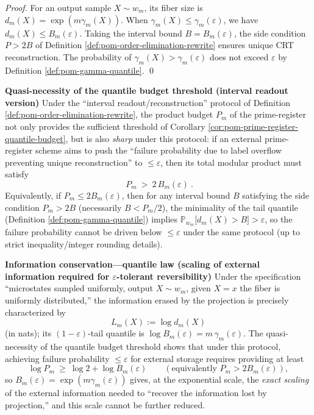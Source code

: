 \begin{proof}
For an output sample \(X\sim w_m\), its fiber size is \(d_m(X)=\exp(m\gamma_m(X))\).
When \(\gamma_m(X)\le\gamma_m(\varepsilon)\), we have \(d_m(X)\le B_m(\varepsilon)\).
Taking the interval bound \(B=B_m(\varepsilon)\), the side condition \(P>2B\) of Definition \ref{def:pom-order-elimination-rewrite} ensures unique CRT reconstruction.
The probability of \(\gamma_m(X)>\gamma_m(\varepsilon)\) does not exceed \(\varepsilon\) by Definition \ref{def:pom-gamma-quantile}. \qed
\end{proof}

\medskip\noindent\textbf{Quasi-necessity of the quantile budget threshold (interval readout version)}
Under the ``interval readout/reconstruction'' protocol of Definition \ref{def:pom-order-elimination-rewrite}, the product budget \(P_m\) of the prime-register not only provides the sufficient threshold of Corollary \ref{cor:pom-prime-register-quantile-budget}, but is also \emph{sharp} under this protocol:
if an external prime-register scheme aims to push the ``failure probability due to label overflow preventing unique reconstruction'' to \(\le \varepsilon\), then its total modular product must satisfy
\[
\boxed{\ P_m\ >\ 2\,B_m(\varepsilon)\ }.
\]
Equivalently, if \(P_m\le 2B_m(\varepsilon)\), then for any interval bound \(B\) satisfying the side condition \(P_m>2B\) (necessarily \(B<P_m/2\)), the minimality of the tail quantile (Definition \ref{def:pom-gamma-quantile}) implies
\(\mathbb{P}_{w_m}\!\big[d_m(X)>B\big]>\varepsilon\), so the failure probability cannot be driven below \(\le\varepsilon\) under the same protocol
(up to strict inequality/integer rounding details).

\medskip\noindent\textbf{Information conservation---quantile law (scaling of external information required for \(\varepsilon\)-tolerant reversibility)}
Under the specification ``microstates sampled uniformly, output \(X\sim w_m\), given \(X=x\) the fiber is uniformly distributed,'' the information erased by the projection is precisely characterized by
\[
L_m(X):=\log d_m(X)
\]
(in nats); its \((1-\varepsilon)\)-tail quantile is
\(\log B_m(\varepsilon)=m\,\gamma_m(\varepsilon)\).
The quasi-necessity of the quantile budget threshold shows that under this protocol, achieving failure probability \(\le\varepsilon\) for external storage requires providing at least
\[
\log P_m\ \ge\ \log 2+\log B_m(\varepsilon)
\qquad(\text{equivalently }P_m>2B_m(\varepsilon)),
\]
so \(B_m(\varepsilon)=\exp(m\gamma_m(\varepsilon))\) gives, at the exponential scale, the \emph{exact scaling} of the external information needed to ``recover the information lost by projection,'' and this scale cannot be further reduced.

